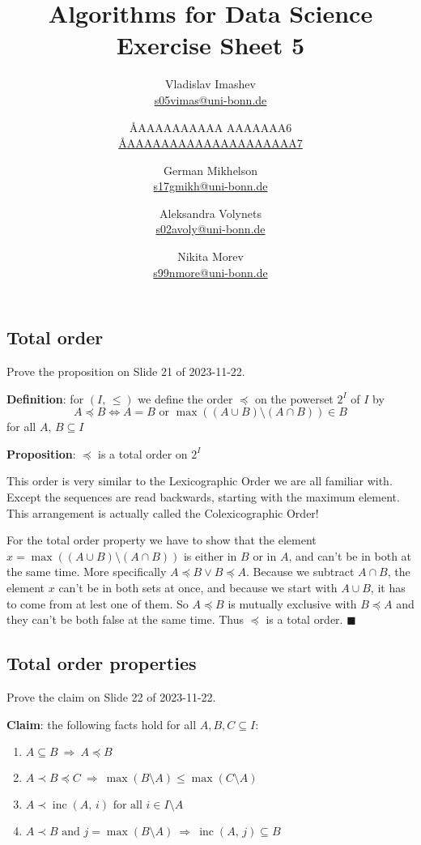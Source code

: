 \documentclass{article}
\title{Algorithms for Data Science \\ Exercise Sheet 5}
\author{
  Vladislav Imashev \\ \href{mailto:s05vimas@uni-bonn.de}{s05vimas@uni-bonn.de} \and
  \AA{AAAAAAAAAA AAAAAAA}{6} \\ \href{mailto:\AA{AAAAAAAAAAAAAAAAAAAA}{7}}{\AA{AAAAAAAAAAAAAAAAAAAA}{7}} \and
  German Mikhelson \\ \href{mailto:s17gmikh@uni-bonn.de}{s17gmikh@uni-bonn.de} \and
  Aleksandra Volynets \\ \href{mailto:s02avoly@uni-bonn.de}{s02avoly@uni-bonn.de} \and
  Nikita Morev \\ \href{mailto:s99nmore@uni-bonn.de}{s99nmore@uni-bonn.de}
}
\newcommand{\inc}{\operatorname{inc}}
\begin{document}
  \maketitle

  \setcounter{section}{5}
  \subsection{Total order}
  \begin{centerframebox}
    Prove the proposition on Slide 21 of 2023-11-22.

    \textbf{Definition}: for $(I,\, \leq)$ we define the order $\preceq$ on the powerset $2^I$ of $I$ by
    \[ A \preceq B \iff A=B \textrm{ or } \max((A\cup B)\setminus(A\cap B))\in B \]
    for all $A,\, B \subseteq I$

    \textbf{Proposition}: $\preceq$ is a total order on $2^I$
  \end{centerframebox}
  This order is very similar to the Lexicographic Order we are all familiar with.
  Except the sequences are read backwards, starting with the maximum element.
  This arrangement is actually called the Colexicographic Order!

  For the total order property we have to show that the element $x = \max((A\cup B)\setminus(A\cap B))$
  is either in $B$ or in $A$, and can't be in both at the same time.
  More specifically $A \preceq B \lor B \preceq A$.
  Because we subtract $A\cap B$, the element $x$ can't be in both sets at once,
  and because we start with $A\cup B$, it has to come from at lest one of them.
  So $A \preceq B$ is mutually exclusive with $B \preceq A$ and they can't be both false at the same time.
  Thus $\preceq$ is a total order.
  $\blacksquare$

  \subsection{Total order properties}
  \begin{centerframebox}
    Prove the claim on Slide 22 of 2023-11-22.

    \textbf{Claim}: the following facts hold for all $A,B,C \subseteq I$:
    \begin{enumerate}[label=(\roman*)]
      \item $A \subseteq B ~\Longrightarrow~ A \preceq B$
      \item $A \prec B \preceq C ~\Longrightarrow~ \max(B \setminus A) \leq \max(C \setminus A)$
      \item $A \prec \inc(A,\, i) \textrm{ for all } i \in I \setminus A$
      \item $A \prec B \textrm{ and } j = \max(B \setminus A) ~\Longrightarrow~ \inc(A,\, j) \subseteq B$
    \end{enumerate}
  \end{centerframebox}
\end{document}
